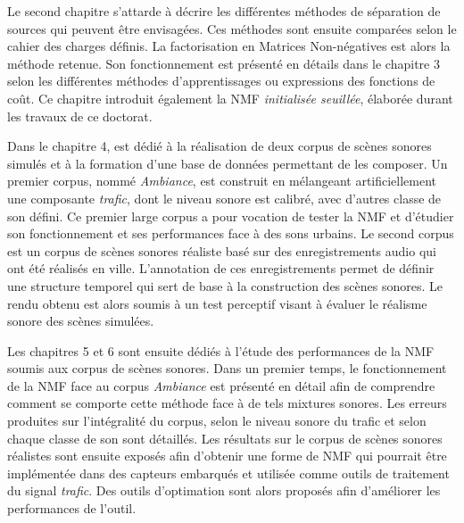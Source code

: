 Le second chapitre s'attarde à décrire les différentes méthodes de séparation de sources qui peuvent être envisagées. Ces méthodes sont ensuite comparées selon le cahier des charges définis. La factorisation en Matrices Non-négatives est alors la méthode retenue. 
Son fonctionnement est présenté en détails dans le chapitre 3 selon les différentes méthodes d'apprentissages ou expressions des fonctions de coût. Ce chapitre introduit également la NMF \textit{initialisée seuillée}, élaborée durant les travaux de ce doctorat. 

Dans le chapitre 4, est dédié à la réalisation de deux corpus de scènes sonores simulés et à la formation d'une base de données permettant de les composer. 
Un premier corpus, nommé \textit{Ambiance}, est construit en mélangeant artificiellement une composante \textit{trafic}, dont le niveau sonore est calibré, avec d'autres classe de son défini. Ce premier large corpus a pour vocation de tester la NMF et d'étudier son fonctionnement et ses performances face à des sons urbains. 
Le second corpus est un corpus de scènes sonores réaliste basé sur des enregistrements audio qui ont été réalisés en ville.
L'annotation de ces enregistrements permet de définir une structure temporel qui sert de base à la construction des scènes sonores. Le rendu obtenu est alors soumis à un test perceptif visant à évaluer le réalisme sonore des scènes simulées. 

Les chapitres 5 et 6 sont ensuite dédiés à l'étude des performances de la NMF soumis aux corpus de scènes sonores. Dans un premier temps, le fonctionnement de la NMF face au corpus \textit{Ambiance} est présenté en détail afin de comprendre comment se comporte cette méthode face à de tels mixtures sonores. Les erreurs produites sur l'intégralité du corpus, selon le niveau sonore du trafic et selon chaque classe de son sont détaillés. 
Les résultats sur le corpus de scènes sonores réalistes sont ensuite exposés afin d'obtenir une forme de NMF qui pourrait être implémentée dans des capteurs embarqués et utilisée comme outils de traitement du signal \textit{trafic}. Des outils d'optimation sont alors proposés afin d'améliorer les performances de l'outil.